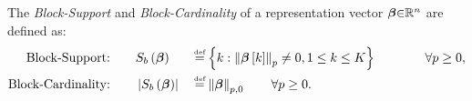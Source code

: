 \begin{Mydefinition}
\label{Def:Block Support} 
\leftbar
The \emph{Block-Support} and \emph{Block-Cardinality} of a representation vector $\boldsymbol{\beta} {\in} \mathbb{R}^{n}$ are defined as:
\begin{gather*}
\label{eq:Block Support}
\begin{aligned}
\myBSuppTxt &\textrm{:} \qquad S_b\myparanthese{\mybeta} && \myeq \mybrace{k: \mynorm{\mybeta\mybracket{k}}_{p} \neq 0, 1 \leq k \leq K} \qquad &&&\forall p \geq 0, \\
\myBCardTxt &\textrm{:} \qquad \myabs{S_b\myparanthese{\mybeta}} && \myeq \mynorm{\mybeta}_{p,0} \qquad \forall p \geq 0. \\
\end{aligned}
\end{gather*}
\endleftbar
\end{Mydefinition}